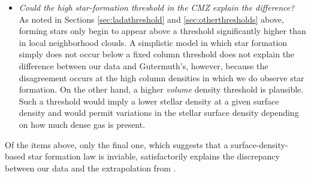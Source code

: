 \documentclass[twocolumn]{aastex61}
\begin{document}
\begin{itemize}
    \item \emph{Could the high star-formation threshold in the CMZ explain the
        difference?}
        As noted in Sections \ref{sec:ladathreshold} and
        \ref{sec:otherthresholds} above, forming stars only begin to appear
        above a threshold significantly higher than in local neighborhood
        clouds.  A simplistic model in which star formation simply does not
        occur below a fixed column threshold does not explain the difference
        between our data and Gutermuth's, however, because the disagreement
        occurs at the high column densities in which we do observe star
        formation.  On the other hand, a higher \emph{volume} density threshold
        is plausible.  Such a threshold would imply a lower stellar density at
        a given surface density and would  permit variations in the stellar
        surface density depending on how much dense gas is present.



\end{itemize}

Of the items above, only the final one, which suggests that a surface-density-based
star formation law is inviable, satisfactorily explains the discrepancy between
our data and the extrapolation from \citet{Gutermuth2011a}.




\end{document}
